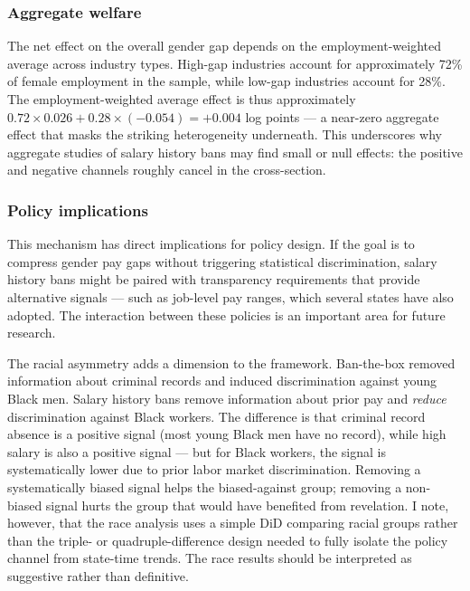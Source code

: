 \documentclass[12pt]{article}
\begin{document}
\subsubsection*{Aggregate welfare} The net effect on the overall gender gap depends on the employment-weighted average across industry types. High-gap industries account for approximately 72\% of female employment in the sample, while low-gap industries account for 28\%. The employment-weighted average effect is thus approximately $0.72 \times 0.026 + 0.28 \times (-0.054) = +0.004$ log points --- a near-zero aggregate effect that masks the striking heterogeneity underneath. This underscores why aggregate studies of salary history bans may find small or null effects: the positive and negative channels roughly cancel in the cross-section.

\subsubsection*{Policy implications} This mechanism has direct implications for policy design. If the goal is to compress gender pay gaps without triggering statistical discrimination, salary history bans might be paired with transparency requirements that provide alternative signals --- such as job-level pay ranges, which several states have also adopted. The interaction between these policies is an important area for future research.

The racial asymmetry adds a dimension to the \citet{DoleacHansen2020} framework. Ban-the-box removed information about criminal records and induced discrimination against young Black men. Salary history bans remove information about prior pay and \emph{reduce} discrimination against Black workers. The difference is that criminal record absence is a positive signal (most young Black men have no record), while high salary is also a positive signal --- but for Black workers, the signal is systematically lower due to prior labor market discrimination. Removing a systematically biased signal helps the biased-against group; removing a non-biased signal hurts the group that would have benefited from revelation. I note, however, that the race analysis uses a simple DiD comparing racial groups rather than the triple- or quadruple-difference design needed to fully isolate the policy channel from state-time trends. The race results should be interpreted as suggestive rather than definitive.
\end{document}

